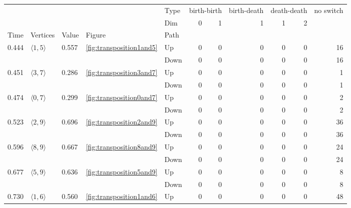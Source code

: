 \documentclass{article}
\begin{document}
\begin{center}
\begin{tabular}{lllllrrrrrr}
\toprule
 &  &  &  & Type & \multicolumn{2}{r}{birth-birth} & birth-death & \multicolumn{2}{r}{death-death} & no switch \\
 &  &  &  & Dim & 0 & 1 & 1 & 1 & 2 &  \\
Time & Vertices & Value & Figure & Path &  &  &  &  &  &  \\
\midrule
\multirow[t]{2}{*}{0.444} & \multirow[t]{2}{*}{$\langle1, 5\rangle$} & \multirow[t]{2}{*}{0.557} & \multirow[t]{2}{*}{\ref{fig:transposition1and5}} & Up & 0 & 0 & 0 & 0 & 0 & 16 \\
 &  &  &  & Down & 0 & 0 & 0 & 0 & 0 & 16 \\
\cline{1-11} \cline{2-11} \cline{3-11} \cline{4-11}
\multirow[t]{2}{*}{0.451} & \multirow[t]{2}{*}{$\langle3, 7\rangle$} & \multirow[t]{2}{*}{0.286} & \multirow[t]{2}{*}{\ref{fig:transposition3and7}} & Up & 0 & 0 & 0 & 0 & 0 & 1 \\
 &  &  &  & Down & 0 & 0 & 0 & 0 & 0 & 1 \\
\cline{1-11} \cline{2-11} \cline{3-11} \cline{4-11}
\multirow[t]{2}{*}{0.474} & \multirow[t]{2}{*}{$\langle0, 7\rangle$} & \multirow[t]{2}{*}{0.299} & \multirow[t]{2}{*}{\ref{fig:transposition0and7}} & Up & 0 & 0 & 0 & 0 & 0 & 2 \\
 &  &  &  & Down & 0 & 0 & 0 & 0 & 0 & 2 \\
\cline{1-11} \cline{2-11} \cline{3-11} \cline{4-11}
\multirow[t]{2}{*}{0.523} & \multirow[t]{2}{*}{$\langle2, 9\rangle$} & \multirow[t]{2}{*}{0.696} & \multirow[t]{2}{*}{\ref{fig:transposition2and9}} & Up & 0 & 0 & 0 & 0 & 0 & 36 \\
 &  &  &  & Down & 0 & 0 & 0 & 0 & 0 & 36 \\
\cline{1-11} \cline{2-11} \cline{3-11} \cline{4-11}
\multirow[t]{2}{*}{0.596} & \multirow[t]{2}{*}{$\langle8, 9\rangle$} & \multirow[t]{2}{*}{0.667} & \multirow[t]{2}{*}{\ref{fig:transposition8and9}} & Up & 0 & 0 & 0 & 0 & 0 & 24 \\
 &  &  &  & Down & 0 & 0 & 0 & 0 & 0 & 24 \\
\cline{1-11} \cline{2-11} \cline{3-11} \cline{4-11}
\multirow[t]{2}{*}{0.677} & \multirow[t]{2}{*}{$\langle5, 9\rangle$} & \multirow[t]{2}{*}{0.636} & \multirow[t]{2}{*}{\ref{fig:transposition5and9}} & Up & 0 & 0 & 0 & 0 & 0 & 8 \\
 &  &  &  & Down & 0 & 0 & 0 & 0 & 0 & 8 \\
\cline{1-11} \cline{2-11} \cline{3-11} \cline{4-11}
\multirow[t]{2}{*}{0.730} & \multirow[t]{2}{*}{$\langle1, 6\rangle$} & \multirow[t]{2}{*}{0.560} & \multirow[t]{2}{*}{\ref{fig:transposition1and6}} & Up & 0 & 0 & 0 & 0 & 0 & 48 \\

\end{tabular}
\end{center}
\end{document}
